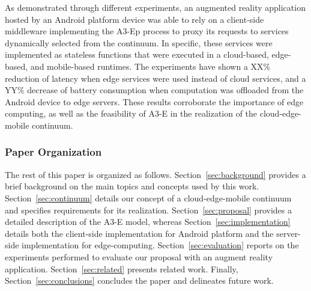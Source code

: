 



As demonstrated through different experiments, an augmented reality application hosted by an Android platform device was able to rely on a client-side middleware implementing the A3-Ep process to proxy its requests to services dynamically selected from the continuum. In specific, these services were implemented as stateless functions that were executed in a cloud-based, edge-based, and mobile-based runtimes. The experiments have shown a XX\% reduction of latency when edge services were used instead of cloud services, and a YY\% decrease of battery consumption when computation was offloaded from the Android device to edge servers. These results corroborate the importance of edge computing, as well as the feasibility of A3-E in the realization of the cloud-edge-mobile continuum.




\subsubsection*{Paper Organization}

The rest of this paper is organized as follows. 
Section~\ref{sec:background} provides a brief background on the main topics and concepts used by this work. Section~\ref{sec:continuum} details our concept of a cloud-edge-mobile continuum and specifies requirements for its realization. Section~\ref{sec:proposal} provides a detailed description of the A3-E model, whereas Section~\ref{sec:implementation} details both the client-side implementation for Android platform and the server-side implementation for edge-computing. Section~\ref{sec:evaluation} reports on the experiments performed to evaluate our proposal with an augment reality application. Section~\ref{sec:related} presents related work. Finally, Section~\ref{sec:conclusions} concludes the paper and delineates future work.




